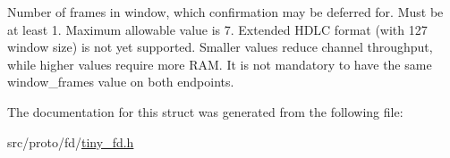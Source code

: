 Number of frames in window, which confirmation may be deferred for. Must be at least 1. Maximum allowable value is 7. Extended H\+D\+LC format (with 127 window size) is not yet supported. Smaller values reduce channel throughput, while higher values require more R\+AM. It is not mandatory to have the same window\+\_\+frames value on both endpoints. 

The documentation for this struct was generated from the following file\+:\begin{DoxyCompactItemize}
\item 
src/proto/fd/\hyperlink{tiny__fd_8h}{tiny\+\_\+fd.\+h}\end{DoxyCompactItemize}
